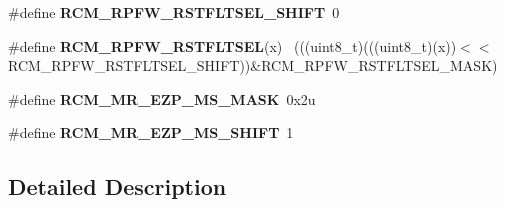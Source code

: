 \begin{DoxyCompactItemize}
\item 
\hypertarget{group___r_c_m___register___masks_ga489d9757284af48af000b769d36bf21a}{}\#define {\bfseries R\+C\+M\+\_\+\+R\+P\+F\+W\+\_\+\+R\+S\+T\+F\+L\+T\+S\+E\+L\+\_\+\+S\+H\+I\+F\+T}~0\label{group___r_c_m___register___masks_ga489d9757284af48af000b769d36bf21a}

\item 
\hypertarget{group___r_c_m___register___masks_gaed8a9ebad93d9ea2a3b3a827890f983d}{}\#define {\bfseries R\+C\+M\+\_\+\+R\+P\+F\+W\+\_\+\+R\+S\+T\+F\+L\+T\+S\+E\+L}(x)                                    ~(((uint8\+\_\+t)(((uint8\+\_\+t)(x))$<$$<$R\+C\+M\+\_\+\+R\+P\+F\+W\+\_\+\+R\+S\+T\+F\+L\+T\+S\+E\+L\+\_\+\+S\+H\+I\+F\+T))\&R\+C\+M\+\_\+\+R\+P\+F\+W\+\_\+\+R\+S\+T\+F\+L\+T\+S\+E\+L\+\_\+\+M\+A\+S\+K)\label{group___r_c_m___register___masks_gaed8a9ebad93d9ea2a3b3a827890f983d}

\item 
\hypertarget{group___r_c_m___register___masks_ga16d5d09d05454765c2097d0728ba9494}{}\#define {\bfseries R\+C\+M\+\_\+\+M\+R\+\_\+\+E\+Z\+P\+\_\+\+M\+S\+\_\+\+M\+A\+S\+K}~0x2u\label{group___r_c_m___register___masks_ga16d5d09d05454765c2097d0728ba9494}

\item 
\hypertarget{group___r_c_m___register___masks_ga3fd9237201ed39d58be104c022385815}{}\#define {\bfseries R\+C\+M\+\_\+\+M\+R\+\_\+\+E\+Z\+P\+\_\+\+M\+S\+\_\+\+S\+H\+I\+F\+T}~1\label{group___r_c_m___register___masks_ga3fd9237201ed39d58be104c022385815}

\end{DoxyCompactItemize}


\subsection{Detailed Description}

